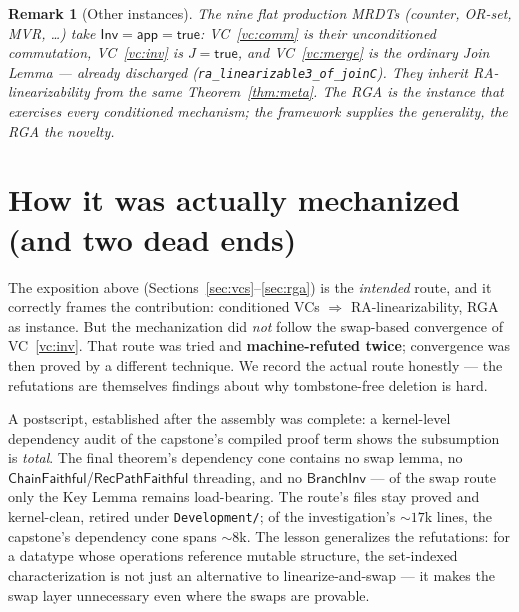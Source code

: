 \documentclass[11pt]{article}
\newtheorem{remark}[theorem]{Remark}
\newcommand{\lean}[1]{\texttt{#1}}
\newcommand{\Inv}{\mathsf{Inv}}
\newcommand{\app}{\mathsf{app}}
\newcommand{\RVF}{\textsf{RecPathFaithful}}
\newcommand{\ChainFaithful}{\textsf{ChainFaithful}}
\begin{document}
\begin{remark}[Other instances]
The nine flat production MRDTs (counter, OR-set, MVR, \dots) take $\Inv=\app=\mathsf{true}$:
VC~\ref{vc:comm} is their unconditioned commutation, VC~\ref{vc:inv} is $J=\mathsf{true}$,
and VC~\ref{vc:merge} is the ordinary Join Lemma --- already discharged
(\lean{ra\_linearizable3\_of\_joinC}). They inherit RA-linearizability from the same
Theorem~\ref{thm:meta}. The RGA is the instance that exercises every conditioned mechanism;
the framework supplies the generality, the RGA the novelty.
\end{remark}

\section{How it was actually mechanized (and two dead ends)}\label{sec:actual}

The exposition above (Sections~\ref{sec:vcs}--\ref{sec:rga}) is the \emph{intended} route, and it
correctly frames the contribution: conditioned VCs $\Rightarrow$ RA-linearizability, RGA as
instance. But the mechanization did \emph{not} follow the swap-based convergence of
VC~\ref{vc:inv}. That route was tried and \textbf{machine-refuted twice}; convergence was then
proved by a different technique. We record the actual route honestly --- the refutations are
themselves findings about why tombstone-free deletion is hard.

A postscript, established after the assembly was complete: a kernel-level dependency audit of
the capstone's compiled proof term shows the subsumption is \emph{total}. The final theorem's
dependency cone contains no swap lemma, no $\ChainFaithful$/$\RVF$ threading, and no
$\mathsf{BranchInv}$ --- of the swap route only the Key Lemma remains load-bearing. The
route's files stay proved and kernel-clean, retired under \lean{Development/}; of the
investigation's ${\sim}17$k lines, the capstone's dependency cone spans ${\sim}8$k. The
lesson generalizes the refutations: for a datatype whose operations reference mutable
structure, the set-indexed characterization is not just an alternative to
linearize-and-swap --- it makes the swap layer unnecessary even where the swaps are
provable.
\end{document}
